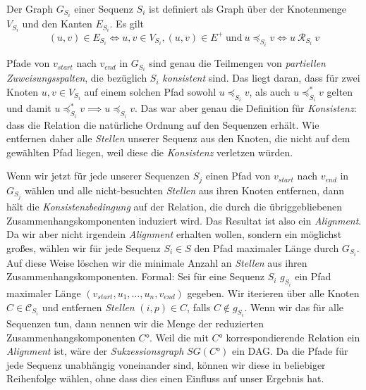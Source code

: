 \begin{definition}
	Der Graph $G_{S_i}$ einer Sequenz $S_i$ ist definiert als Graph über der Knotenmenge $V_{S_i}$ und den Kanten $E_{S_i}$. Es gilt
	\begin{equation}
		(u,v) \in E_{S_i} \Longleftrightarrow u,v \in V_{S_i}, (u,v) \in E^{+}\: \text{und}\: u \preceq_{S_i} v \Longleftrightarrow u\: \mathcal{R}_{S_i}\: v
	\end{equation}
\end{definition}

Pfade von $v_{start}$ nach $v_{end}$ in $G_{S_i}$ sind genau die Teilmengen von \emph{partiellen Zuweisungsspalten}, die bezüglich $S_i$ \emph{konsistent} sind. Das liegt daran, dass für zwei Knoten $u,v \in V_{S_i}$ auf einem solchen Pfad sowohl $u \preceq_{S_i} v$, als auch $u \preceq_{S_i}^{*} v$ gelten und damit $u \preceq_{S_i}^{*} v \implies u \preceq_{S_i} v$. Das war aber genau die Definition für \emph{Konsistenz}: dass die Relation die natürliche Ordnung auf den Sequenzen erhält. Wie entfernen daher alle \emph{Stellen} unserer Sequenz aus den Knoten, die nicht auf dem gewählten Pfad liegen, weil diese die \emph{Konsistenz} verletzen würden. 

Wenn wir jetzt für jede unserer Sequenzen $S_j$ einen Pfad von $v_{start}$ nach $v_{end}$ in $G_{S_j}$ wählen und alle nicht-besuchten \emph{Stellen}  aus ihren Knoten entfernen, dann hält die \emph{Konsistenzbedingung} auf der Relation, die durch die übriggebliebenen Zusammenhangskomponenten induziert wird. Das Resultat ist also ein \emph{Alignment}. Da wir aber nicht irgendein \emph{Alignment} erhalten wollen, sondern ein möglichst großes, wählen wir für jede Sequenz $S_i \in S$ den Pfad maximaler Länge durch $G_{S_i}$. Auf diese Weise löschen wir die minimale Anzahl an \emph{Stellen} aus ihren Zusammenhangskomponenten. Formal: Sei für eine Sequenz $S_i$ $g_{S_i}$ ein Pfad maximaler Länge $(v_{start}, u_1, \dots, u_n, v_{end})$ gegeben. Wir iterieren über alle Knoten $C \in \mathcal{C}_{S_i}$ und entfernen \emph{Stellen} $(i,p) \in C$, falls $C \notin g_{S_i}$. Wenn wir das für alle Sequenzen tun, dann nennen wir die Menge der reduzierten Zusammenhangskomponenten $C°$. Weil die mit $C°$ korrespondierende Relation ein \emph{Alignment} ist, wäre der \emph{Sukzessionsgraph} $SG(C°)$ ein DAG. Da die Pfade für jede Sequenz unabhängig voneinander sind, können wir diese in beliebiger Reihenfolge wählen, ohne dass dies einen Einfluss auf unser Ergebnis hat.

